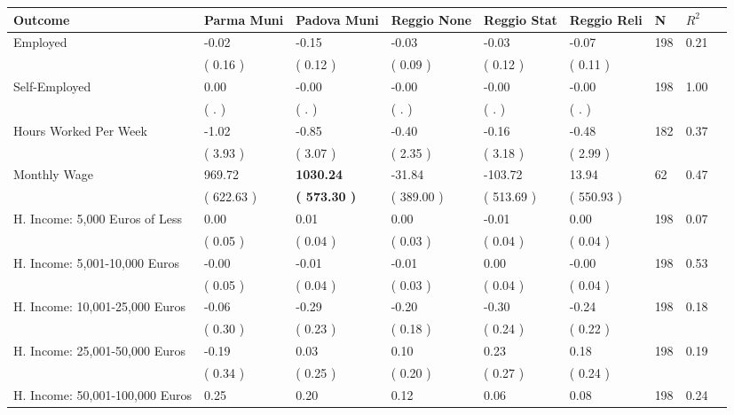 \begin{tabular}{L{6.2cm} C{1.8cm} C{1.8cm} C{1.8cm} C{1.8cm} C{1.8cm} C{1.8cm} C{0.3cm} C{0.3cm}}
\toprule
 \textbf{Outcome} & \textbf{Parma Muni} & \textbf{Padova Muni} & \textbf{Reggio None} & \textbf{Reggio Stat} & \textbf{Reggio Reli} & \textbf{N} & \textbf{$ R^2$} \\
\midrule
Employed &     -0.02 &     -0.15 &     -0.03 &     -0.03 &     -0.07  & 198 &       0.21 \\ 
 & (     0.16 ) & (     0.12 ) & (     0.09 ) & (     0.12 ) & (     0.11 )  & \\
Self-Employed &      0.00 &     -0.00 &     -0.00 &     -0.00 &     -0.00  & 198 &       1.00 \\ 
 & (        . ) & (        . ) & (        . ) & (        . ) & (        . )  & \\
Hours Worked Per Week &     -1.02 &     -0.85 &     -0.40 &     -0.16 &     -0.48  & 182 &       0.37 \\ 
 & (     3.93 ) & (     3.07 ) & (     2.35 ) & (     3.18 ) & (     2.99 )  & \\
Monthly Wage &    969.72 & \textbf{  1030.24} &    -31.84 &   -103.72 &     13.94  & 62 &       0.47 \\ 
 & (   622.63 ) & \textbf{(   573.30 )} & (   389.00 ) & (   513.69 ) & (   550.93 )  & \\
H. Income: 5,000 Euros of Less &      0.00 &      0.01 &      0.00 &     -0.01 &      0.00  & 198 &       0.07 \\ 
 & (     0.05 ) & (     0.04 ) & (     0.03 ) & (     0.04 ) & (     0.04 )  & \\
H. Income: 5,001-10,000 Euros &     -0.00 &     -0.01 &     -0.01 &      0.00 &     -0.00  & 198 &       0.53 \\ 
 & (     0.05 ) & (     0.04 ) & (     0.03 ) & (     0.04 ) & (     0.04 )  & \\
H. Income: 10,001-25,000 Euros &     -0.06 &     -0.29 &     -0.20 &     -0.30 &     -0.24  & 198 &       0.18 \\ 
 & (     0.30 ) & (     0.23 ) & (     0.18 ) & (     0.24 ) & (     0.22 )  & \\
H. Income: 25,001-50,000 Euros &     -0.19 &      0.03 &      0.10 &      0.23 &      0.18  & 198 &       0.19 \\ 
 & (     0.34 ) & (     0.25 ) & (     0.20 ) & (     0.27 ) & (     0.24 )  & \\
H. Income: 50,001-100,000 Euros &      0.25 &      0.20 &      0.12 &      0.06 &      0.08  & 198 &       0.24 \\ 

\end{tabular}
